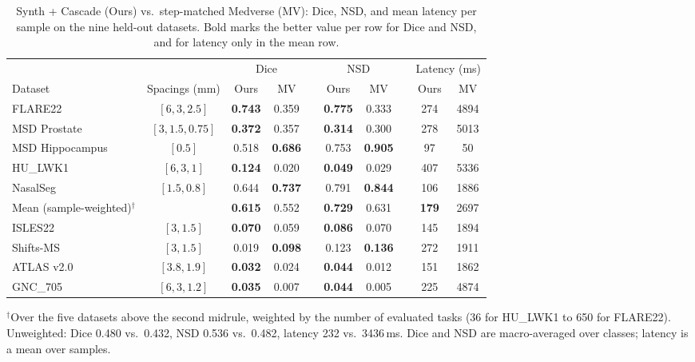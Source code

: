 \begin{table}[t]
  \centering
  \small
  \caption{Synth + Cascade (Ours) vs.\ step-matched Medverse (MV): Dice, NSD,
  and mean latency per sample on the nine held-out datasets. Bold marks the
  better value per row for Dice and NSD, and for latency only in the mean
  row.}
  \label{tab:synth-cascade-medverse-final}
  \begin{tabular}{@{}lccc c cc c cc@{}}
    \toprule
    & & \multicolumn{2}{c}{Dice} & & \multicolumn{2}{c}{NSD} & & \multicolumn{2}{c}{Latency (ms)} \\
    \cmidrule(lr){3-4} \cmidrule(lr){6-7} \cmidrule(lr){9-10}
    Dataset & Spacings (mm) & Ours & MV & & Ours & MV & & Ours & MV \\
    \midrule
    FLARE22         & $[6, 3, 2.5]$    & \textbf{0.743} & 0.359 & & \textbf{0.775} & 0.333 & & 274 & 4894 \\
    MSD Prostate    & $[3, 1.5, 0.75]$ & \textbf{0.372} & 0.357 & & \textbf{0.314} & 0.300 & & 278 & 5013 \\
    MSD Hippocampus & $[0.5]$          & 0.518 & \textbf{0.686} & & 0.753 & \textbf{0.905} & & 97  & 50   \\
    HU\_LWK1        & $[6, 3, 1]$      & \textbf{0.124} & 0.020 & & \textbf{0.049} & 0.029 & & 407 & 5336 \\
    NasalSeg        & $[1.5, 0.8]$     & 0.644 & \textbf{0.737} & & 0.791 & \textbf{0.844} & & 106 & 1886 \\
    \midrule
    Mean (sample-weighted)$^{\dagger}$ & & \textbf{0.615} & 0.552 & & \textbf{0.729} & 0.631 & & \textbf{179} & 2697 \\
    \midrule
    ISLES22         & $[3, 1.5]$       & \textbf{0.070} & 0.059 & & \textbf{0.086} & 0.070 & & 145 & 1894 \\
    Shifts-MS       & $[3, 1.5]$       & 0.019 & \textbf{0.098} & & 0.123 & \textbf{0.136} & & 272 & 1911 \\
    ATLAS v2.0      & $[3.8, 1.9]$     & \textbf{0.032} & 0.024 & & \textbf{0.044} & 0.012 & & 151 & 1862 \\
    GNC\_705        & $[6, 3, 1.2]$    & \textbf{0.035} & 0.007 & & \textbf{0.044} & 0.005 & & 225 & 4874 \\
    \bottomrule
  \end{tabular}
  \par\vspace{0.5em}
  \raggedright\footnotesize
  $^{\dagger}$Over the five datasets above the second midrule, weighted by the
  number of evaluated tasks (36 for HU\_LWK1 to 650 for FLARE22). Unweighted:
  Dice 0.480 vs.\ 0.432, NSD 0.536 vs.\ 0.482, latency 232 vs.\ 3436\,ms. Dice
  and NSD are macro-averaged over classes; latency is a mean over samples.
\end{table}
